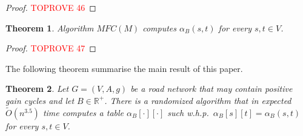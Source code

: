 \documentclass[11pt]{article}
\newtheorem{theorem}{Theorem}[section]
\newcommand{\RR}{\mathbb{R}}
\begin{document}
\begin{proof}\textcolor{red}{TOPROVE 46}\end{proof}

\begin{theorem}\label{theorem:alpha-correctness}
    Algorithm $MFC(M)$ computes $\alpha_B(s,t)$ for every $s,t\in V$.
\end{theorem}

\begin{proof}\textcolor{red}{TOPROVE 47}\end{proof}

The following theorem summarise the main result of this paper.

\begin{theorem}
    Let $G = (V,A,g)$ be a road network that may contain positive gain cycles and let $B \in \RR^{+}$. There is a randomized algorithm that in expected $\tilde{O}(n^{3.5})$ time computes a table $\alpha_B[\cdot][\cdot]$ such w.h.p.\ $\alpha_B[s][t] = \alpha_B(s,t)$ for every $s,t\in V$.
\end{theorem}
\end{document}
